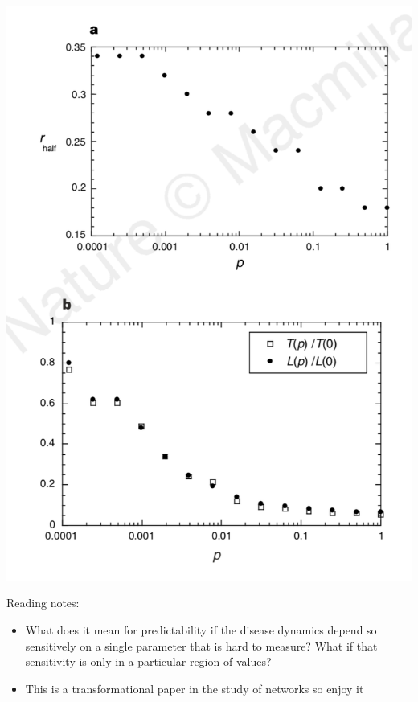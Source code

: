 \documentclass[aspectratio=169]{beamer}
\begin{document}
\begin{frame}

\begin{center}
\includegraphics[height = 0.9\textheight]{figures/watts_collective_1998_fig3}
\end{center}

\end{frame}
\begin{frame}

Reading notes:
\begin{itemize}
\item What does it mean for predictability if the disease dynamics depend so sensitively on a single parameter that is hard to measure?  What if that sensitivity is only in a particular region of values?
\pause
\item This is a transformational paper in the study of networks so enjoy it
\end{itemize}

\end{frame}
\end{document}
